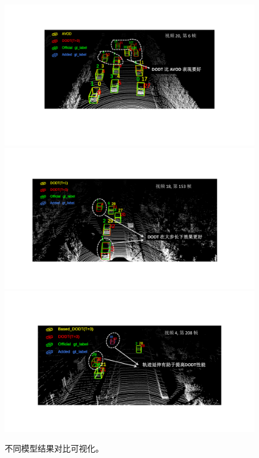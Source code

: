 \begin{figure}[!t]
	\centering
	\includegraphics[trim={4cm, 4cm, 6cm, 4cm}, clip, width=\textwidth]{./imgs/result_compare_01.pdf}
	\includegraphics[trim={4cm, 4cm, 5cm, 4cm}, clip, width=\textwidth]{./imgs/result_compare_02.pdf}
	\includegraphics[trim={4cm, 4cm, 5cm, 4cm}, clip, width=\textwidth]{./imgs/result_compare_03.pdf}
	\caption{不同模型结果对比可视化。}
	\label{fig:result_compare}
\end{figure}
